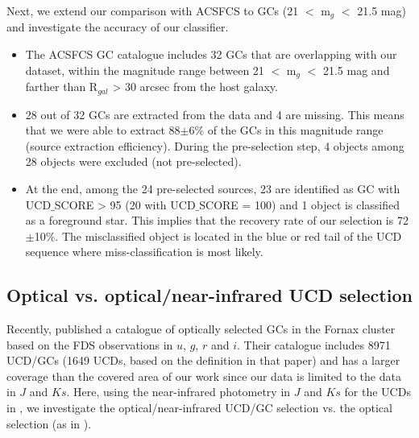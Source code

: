 \documentclass[fleqn,usenatbib]{mnras}
\begin{document}
Next, we extend our comparison with ACSFCS to GCs (21 $<$ m$_g$ $<$ 21.5 mag) and investigate the accuracy of our classifier. 

\begin{itemize}
\item The ACSFCS GC catalogue includes 32 GCs that are overlapping with our dataset, within the magnitude range between 21 $<$ m$_g$ $<$ 21.5 mag and farther than R$_{gal}$ > 30 arcsec from the host galaxy. \\

\item 28 out of 32 GCs are extracted from the data and 4 are missing. This means that we were able to extract 88$\pm$6\% of the GCs in this magnitude range (source extraction efficiency). During the pre-selection step, 4 objects among 28 objects were excluded (not pre-selected). \\

\item At the end, among the 24 pre-selected sources, 23 are identified as GC with UCD$\_$SCORE > 95 (20 with UCD$\_$SCORE = 100) and 1 object is classified as a foreground star. This implies that the recovery rate of our selection is 72$\pm$10\%. The misclassified object is located in the blue or red tail of the UCD sequence where miss-classification is most likely.
\end{itemize}

\subsection{Optical vs. optical/near-infrared UCD selection}
Recently, \citet{Cantiello2020} published a catalogue of optically selected GCs in the Fornax cluster based on the FDS observations in $u$, $g$, $r$ and $i$. Their catalogue includes 8971 UCD/GCs (1649 UCDs, based on the definition in that paper) and has a larger coverage than the covered area of our work since our data is limited to the data in $J$ and $Ks$. Here, using the near-infrared photometry in $J$ and $Ks$ for the UCDs in \citet{Cantiello2020}, we investigate the optical/near-infrared UCD/GC selection vs. the optical selection (as in \citealp{Cantiello2020}).
\end{document}
